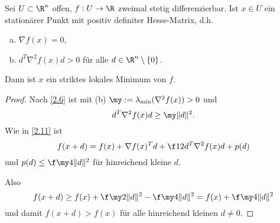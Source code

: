 \documentclass{mycourse}
\begin{document}
\begin{st}
	Sei $U \subset \R^n$ offen, $f: U \to \R$ zweimal stetig differenzierbar.
	Ist $x \in U$ ein stationärer Punkt mit positiv definiter Hesse-Matrix, d.h.
	\begin{enumerate}[(a)]
		\item
			$\nabla f(x) = 0$,
		\item
			$d^T \nabla^2 f(x) d > 0$ für alle $d \in \R^n \setminus \{0\}$.
	\end{enumerate}
	Dann ist $x$ ein striktes lokales Minimum von $f$.
	\begin{proof}
		Nach \ref{2.6} ist mit (b) $\my := \lambda_{\text{min}} (\nabla^2 f(x)) > 0$ und
		\[
			d^T \nabla^2 f(x) d \ge \my \|d\|^2.
		\]
		Wie in \ref{2.11} ist
		\[
			f(x+d)
			= f(x) + \nabla f(x)^T d + \f 12 d^T \nabla^2 f(x) d + p(d)
		\]
		und $p(d) \le \f \my4 \|d\|^2$ für hinreichend kleine $d$.

		Also
		\[
			f(x+d)
			\ge f(x) + \f \my2 \|d\|^2 - \f \my4 \|d\|^2
			= f(x) + \f \my4 \|d\|^2
		\]
		und damit $f(x+d) > f(x)$ für alle hinreichend kleinen $d \neq 0$.
	\end{proof}
\end{st}
\end{document}
